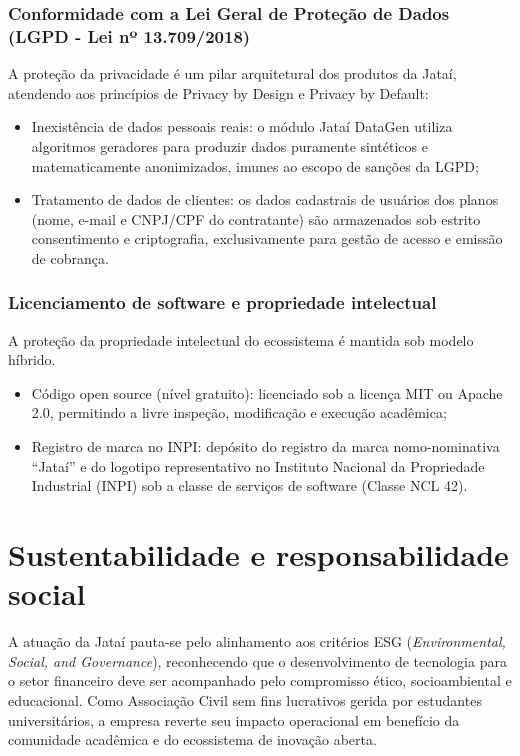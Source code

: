 \documentclass[
  12pt,
  openright,
  oneside,
  a4paper,
  brazilian
]{abntex2}
\begin{document}
\subsection{Conformidade com a Lei Geral de Proteção de Dados (LGPD - Lei nº 13.709/2018)}
A proteção da privacidade é um pilar arquitetural dos produtos da Jataí, atendendo aos princípios de Privacy by Design e Privacy by Default:
\begin{itemize}
    \item{Inexistência de dados pessoais reais:} o módulo Jataí DataGen utiliza algoritmos geradores para produzir dados puramente sintéticos e matematicamente anonimizados, imunes ao escopo de sanções da LGPD;
    \item{Tratamento de dados de clientes:} os dados cadastrais de usuários dos planos (nome, e-mail e CNPJ/CPF do contratante) são armazenados sob estrito consentimento e criptografia, exclusivamente para gestão de acesso e emissão de cobrança.
\end{itemize}

\subsection{Licenciamento de software e propriedade intelectual}
A proteção da propriedade intelectual do ecossistema é mantida sob modelo híbrido.
\begin{itemize}
    \item{Código open source (nível gratuito):} licenciado sob a licença MIT ou Apache 2.0, permitindo a livre inspeção, modificação e execução acadêmica;
    \item{Registro de marca no INPI:} depósito do registro da marca nomo-nominativa ``Jataí'' e do logotipo representativo no Instituto Nacional da Propriedade Industrial (INPI) sob a classe de serviços de software (Classe NCL 42).
\end{itemize}

\chapter{Sustentabilidade e responsabilidade social}
\label{cap:sustentabilidade_social}

A atuação da Jataí pauta-se pelo alinhamento aos critérios ESG (\textit{Environmental, Social, and Governance}), reconhecendo que o desenvolvimento de tecnologia para o setor financeiro deve ser acompanhado pelo compromisso ético, socioambiental e educacional. Como Associação Civil sem fins lucrativos gerida por estudantes universitários, a empresa reverte seu impacto operacional em benefício da comunidade acadêmica e do ecossistema de inovação aberta.
\end{document}
